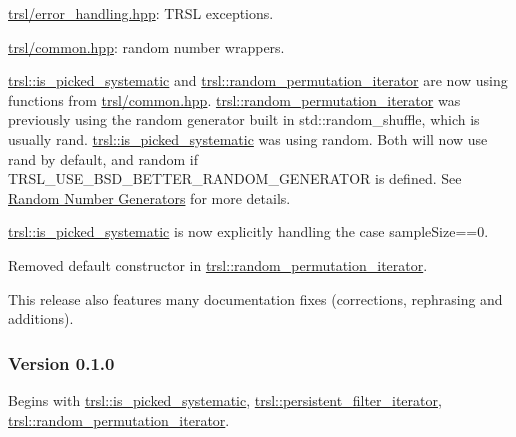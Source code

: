\begin{DoxyItemize}
\item \hyperlink{error__handling_8hpp}{trsl/error\_\-handling.hpp}: TRSL exceptions.
\end{DoxyItemize}


\begin{DoxyItemize}
\item \hyperlink{common_8hpp}{trsl/common.hpp}: random number wrappers.
\end{DoxyItemize}


\begin{DoxyItemize}
\item \hyperlink{classtrsl_1_1is__picked__systematic}{trsl::is\_\-picked\_\-systematic} and \hyperlink{namespacetrsl_afb566791dfade70af49beaa5b816e7ee}{trsl::random\_\-permutation\_\-iterator} are now using functions from \hyperlink{common_8hpp}{trsl/common.hpp}. \hyperlink{namespacetrsl_afb566791dfade70af49beaa5b816e7ee}{trsl::random\_\-permutation\_\-iterator} was previously using the random generator built in {\ttfamily std::random\_\-shuffle}, which is usually {\ttfamily rand}. \hyperlink{classtrsl_1_1is__picked__systematic}{trsl::is\_\-picked\_\-systematic} was using {\ttfamily random}. Both will now use {\ttfamily rand} by default, and {\ttfamily random} if TRSL\_\-USE\_\-BSD\_\-BETTER\_\-RANDOM\_\-GENERATOR is defined. See \hyperlink{group__random}{Random Number Generators} for more details.
\end{DoxyItemize}


\begin{DoxyItemize}
\item \hyperlink{classtrsl_1_1is__picked__systematic}{trsl::is\_\-picked\_\-systematic} is now explicitly handling the case {\ttfamily sampleSize==0}.
\end{DoxyItemize}


\begin{DoxyItemize}
\item Removed default constructor in \hyperlink{namespacetrsl_afb566791dfade70af49beaa5b816e7ee}{trsl::random\_\-permutation\_\-iterator}.
\end{DoxyItemize}

This release also features many documentation fixes (corrections, rephrasing and additions).\hypertarget{group__version__history_version_history_v010}{}\subsubsection{Version 0.1.0}\label{group__version__history_version_history_v010}
Begins with \hyperlink{classtrsl_1_1is__picked__systematic}{trsl::is\_\-picked\_\-systematic}, \hyperlink{classtrsl_1_1persistent__filter__iterator}{trsl::persistent\_\-filter\_\-iterator}, \hyperlink{namespacetrsl_afb566791dfade70af49beaa5b816e7ee}{trsl::random\_\-permutation\_\-iterator}. 